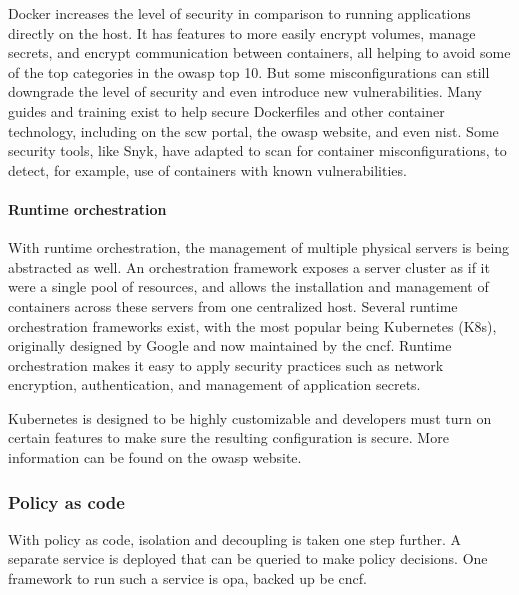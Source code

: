 Docker increases the level of security in comparison to running applications directly on the host.
It has features to more easily encrypt volumes, manage secrets, and encrypt communication between containers, all helping to avoid some of the top categories in the \gls{owasp} top 10.
But some misconfigurations can still downgrade the level of security and even introduce new vulnerabilities.
Many guides and training exist to help secure Dockerfiles and other container technology, including on the \gls{scw} portal, the \gls{owasp} website, and even \gls{nist}.
Some security tools, like Snyk, have adapted to scan for container misconfigurations, to detect, for example, use of containers with known vulnerabilities.

\paragraph{Runtime orchestration}
With runtime orchestration, the management of multiple physical servers is being abstracted as well.
An orchestration framework exposes a server cluster as if it were a single pool of resources, and allows the installation and management of containers across these servers from one centralized host.
Several runtime orchestration frameworks exist, with the most popular being Kubernetes (K8s), originally designed by Google and now maintained by the 
\gls{cncf}.
Runtime orchestration makes it easy to apply security practices such as network encryption, authentication, and management of application secrets. 

Kubernetes is designed to be highly customizable and developers must turn on certain features to make sure the resulting configuration is secure.
More information can be found on the \gls{owasp} website.

\subsubsection{Policy as code}
With policy as code, isolation and decoupling is taken one step further.
A separate service is deployed that can be queried to make policy decisions.
One framework to run such a service is \gls{opa}, backed up be \gls{cncf}.

